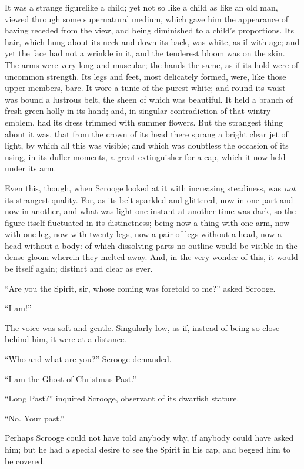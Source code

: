 \documentclass[paper=5.5in:8.5in,BCOR=7mm,twoside,DIV=calc,12pt,usegeometry]{scrbook} %
\begin{document}
It was a strange figure\textemdash like a child; yet not so like a child as like an old man, viewed through some supernatural medium, which gave him the appearance of having receded from the view, and being diminished to a child's proportions. Its hair, which hung about its neck and down its back, was white, as if with age; and yet the face had not a wrinkle in it, and the tenderest bloom was on the skin. The arms were very long and muscular; the hands the same, as if its hold were of uncommon strength. Its legs and feet, most delicately formed, were, like those upper members, bare. It wore a tunic of the purest white; and round its waist was bound a lustrous belt, the sheen of which was beautiful. It held a branch of fresh green holly in its hand; and, in singular contradiction of that wintry emblem, had its dress trimmed with summer flowers. But the strangest thing about it was, that from the crown of its head there sprang a bright clear jet of light, by which all this was visible; and which was doubtless the occasion of its using, in its duller moments, a great extinguisher for a cap, which it now held under its arm.

Even this, though, when Scrooge looked at it with increasing steadiness, was \textit{not} its strangest quality. For, as its belt sparkled and glittered, now in one part and now in another, and what was light one instant at another time was dark, so the figure itself fluctuated in its distinctness; being now a thing with one arm, now with one leg, now with twenty legs, now a pair of legs without a head, now a head without a body: of which dissolving parts no outline would be visible in the dense gloom wherein they melted away. And, in the very wonder of this, it would be itself again; distinct and clear as ever.

\enquote{Are you the Spirit, sir, whose coming was foretold to me?} asked Scrooge.

\enquote{I am!}

The voice was soft and gentle. Singularly low, as if, instead of being so close behind him, it were at a distance.

\enquote{Who and what are you?} Scrooge demanded.

\enquote{I am the Ghost of Christmas Past.}

\enquote{Long Past?} inquired Scrooge, observant of its dwarfish stature.

\enquote{No. Your past.}

Perhaps Scrooge could not have told anybody why, if anybody could have asked him; but he had a special desire to see the Spirit in his cap, and begged him to be covered.
\end{document}

